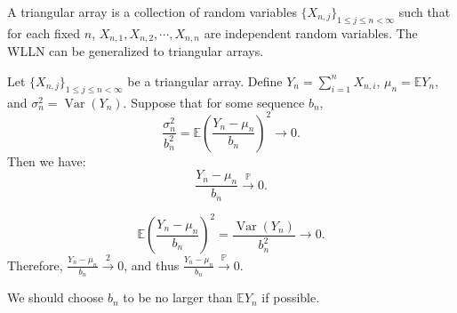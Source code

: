 \documentclass{huhtakm-template-book-v2}
\newcommand{\prob}{\mathbb{P}}
\newcommand{\expect}{\mathbb{E}}
\DeclareMathOperator{\Var}{Var}
\begin{document}
    A triangular array is a collection of random variables $\{X_{n,j}\}_{1 \leq j \leq n < \infty}$ such that for each fixed $n$, $X_{n,1},X_{n,2},\cdots,X_{n,n}$ are independent random variables. The WLLN can be generalized to triangular arrays.
    \begin{thm}
        Let $\{X_{n,j}\}_{1 \leq j \leq n < \infty}$ be a triangular array. Define $Y_{n} = \sum_{i = 1}^{n}X_{n,i}$, $\mu_{n} = \expect{Y_{n}}$, and $\sigma_{n}^{2} = \Var(Y_{n})$. Suppose that for some sequence $b_{n}$,
        \begin{equation*}
            \frac{\sigma_{n}^{2}}{b_{n}^{2}} = \expect\left(\frac{Y_{n}-\mu_{n}}{b_{n}}\right)^{2} \to 0.
        \end{equation*}
        Then we have:
        \begin{equation*}
            \frac{Y_{n}-\mu_{n}}{b_{n}} \xrightarrow{\prob} 0.
        \end{equation*}
    \end{thm}
    \begin{proofing}
        \begin{equation*}
            \expect\left(\frac{Y_{n}-\mu_{n}}{b_{n}}\right)^{2} = \frac{\Var(Y_{n})}{b_{n}^{2}} \to 0.
        \end{equation*}
        Therefore, $\frac{Y_{n}-\mu_{n}}{b_{n}} \xrightarrow{2} 0$, and thus $\frac{Y_{n}-\mu_{n}}{b_{n}} \xrightarrow{\prob} 0$.
    \end{proofing}
    \begin{rem}
        We should choose $b_{n}$ to be no larger than $\expect{Y_{n}}$ if possible.
    \end{rem}
\end{document}
